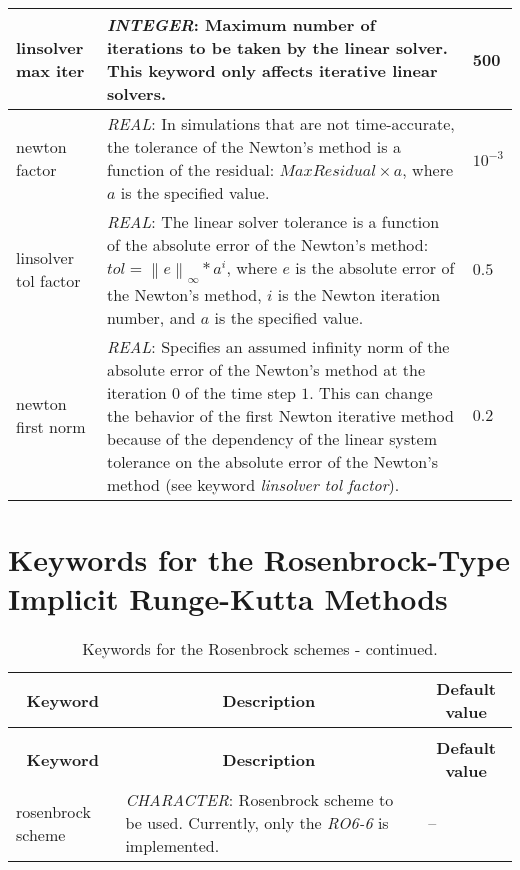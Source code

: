 \documentclass[a4paper,10pt]{report}
\newcommand\norm[1]{\left\lVert#1\right\rVert}
\begin{document}
\begin{longtable}{|p{4cm}|p{9cm}|p{3.2cm}|}
linsolver max iter	& \textit{INTEGER}: Maximum number of iterations to be taken by the linear solver. This keyword only affects iterative linear solvers.		    & 500 \\ \hline

newton factor 	& \textit{REAL}: In simulations that are not time-accurate, the tolerance of the Newton's method is a function of the residual: $MaxResidual \times a$, where $a$ is the specified value.	& $10^{-3}$	\\ \hline


linsolver tol factor 	& \textit{REAL}: The linear solver tolerance is a function of the absolute error of the Newton's method: $tol=\norm{e}_{\infty}*a^i$, where $e$ is the absolute error of the Newton's method, $i$ is the Newton iteration number, and $a$ is the specified value.	& $0.5$	\\ \hline

newton first norm  & \textit{REAL}: Specifies an assumed infinity norm of the absolute error of the Newton's method at the iteration $0$ of the time step $1$.
This can change the behavior of the first Newton iterative method because of the dependency of the linear system tolerance on the absolute error of the Newton's method (see keyword \textit{linsolver tol factor}).
				   & $0.2$ \\ \hline







\end{longtable}

\section{Keywords for the Rosenbrock-Type Implicit Runge-Kutta Methods}

\begin{longtable}{|p{4cm}|p{10cm}|p{2.2cm}|}
\caption{Keywords for the Rosenbrock schemes.} \label{tab:Rosenbrockkey} \\
\hline
\multicolumn{1}{|c|}{\textbf{Keyword}} & \multicolumn{1}{c|}{\textbf{Description}} & \multicolumn{1}{c|}{\textbf{Default value}} \\ \hline
\endfirsthead

\caption{Keywords for the Rosenbrock schemes - continued.} \\
\hline
\multicolumn{1}{|c|}{\textbf{Keyword}} & \multicolumn{1}{c|}{\textbf{Description}} & \multicolumn{1}{c|}{\textbf{Default value}} \\ \hline
\endhead

rosenbrock scheme	& \textit{CHARACTER}: Rosenbrock scheme to be used. Currently, only the \textit{RO6-6} is implemented.		    & -- \\ \hline

\end{longtable}
\end{document}
